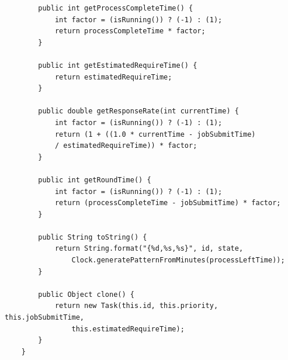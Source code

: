 \documentclass[12pt, a4paper, UTF8]{ctexart}
\begin{document}
\begin{verbatim}
        public int getProcessCompleteTime() {
            int factor = (isRunning()) ? (-1) : (1);
            return processCompleteTime * factor;
        }
    
        public int getEstimatedRequireTime() {
            return estimatedRequireTime;
        }
    
        public double getResponseRate(int currentTime) {
            int factor = (isRunning()) ? (-1) : (1);
            return (1 + ((1.0 * currentTime - jobSubmitTime) 
            / estimatedRequireTime)) * factor;
        }
    
        public int getRoundTime() {
            int factor = (isRunning()) ? (-1) : (1);
            return (processCompleteTime - jobSubmitTime) * factor;
        }
    
        public String toString() {
            return String.format("{%d,%s,%s}", id, state, 
                Clock.generatePatternFromMinutes(processLeftTime));
        }
    
        public Object clone() {
            return new Task(this.id, this.priority, this.jobSubmitTime, 
                this.estimatedRequireTime);
        }
    }    
\end{verbatim}

\newpage
\end{document}
